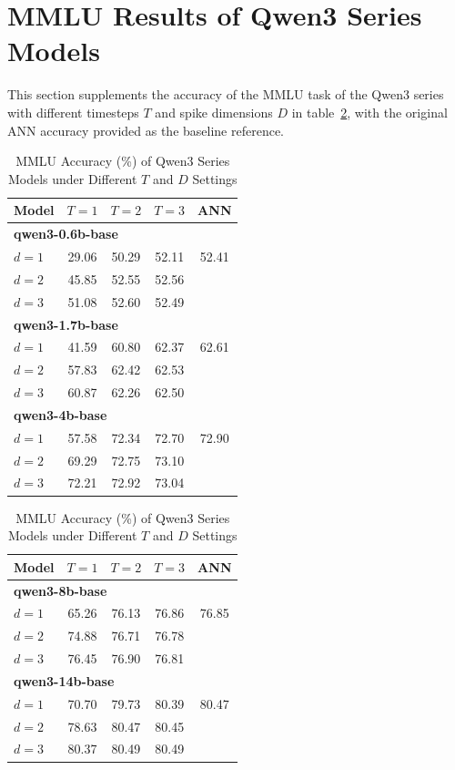 \section{MMLU Results of Qwen3 Series Models}\label{overall_qwen3}
This section supplements the accuracy of the MMLU task of the Qwen3 series with different timesteps \(T\) and spike dimensions \(D\) in table~\ref{tab:appendix_qwen3_mmlu}, with the original ANN accuracy provided as the baseline reference.

\begin{table}[htbp!]
\centering
\caption{MMLU Accuracy (\%) of Qwen3 Series Models under Different $T$ and $D$ Settings}
\label{tab:appendix_qwen3_mmlu}
\small
\begin{tabular}[t]{lcccc}
\toprule
\textbf{Model} & $T{=}1$ & $T{=}2$ & $T{=}3$ & \textbf{ANN} \\
\midrule
\multicolumn{5}{l}{\textbf{qwen3-0.6b-base}} \\
$d{=}1$ & 29.06 & 50.29 & 52.11 & 52.41 \\
$d{=}2$ & 45.85 & 52.55 & 52.56 & \\
$d{=}3$ & 51.08 & 52.60 & 52.49 & \\
\midrule
\multicolumn{5}{l}{\textbf{qwen3-1.7b-base}} \\
$d{=}1$ & 41.59 & 60.80 & 62.37 & 62.61 \\
$d{=}2$ & 57.83 & 62.42 & 62.53 & \\
$d{=}3$ & 60.87 & 62.26 & 62.50 & \\
\midrule
\multicolumn{5}{l}{\textbf{qwen3-4b-base}} \\
$d{=}1$ & 57.58 & 72.34 & 72.70 & 72.90 \\
$d{=}2$ & 69.29 & 72.75 & 73.10 & \\
$d{=}3$ & 72.21 & 72.92 & 73.04 & \\
\bottomrule
\end{tabular}
\hspace{2.5em}
\begin{tabular}[t]{lcccc}
\toprule
\textbf{Model} & $T{=}1$ & $T{=}2$ & $T{=}3$ & \textbf{ANN} \\
\midrule
\multicolumn{5}{l}{\textbf{qwen3-8b-base}} \\
$d{=}1$ & 65.26 & 76.13 & 76.86 & 76.85 \\
$d{=}2$ & 74.88 & 76.71 & 76.78 & \\
$d{=}3$ & 76.45 & 76.90 & 76.81 & \\
\midrule
\multicolumn{5}{l}{\textbf{qwen3-14b-base}} \\
$d{=}1$ & 70.70 & 79.73 & 80.39 & 80.47 \\
$d{=}2$ & 78.63 & 80.47 & 80.45 & \\
$d{=}3$ & 80.37 & 80.49 & 80.49 & \\
\bottomrule
\end{tabular}
\end{table}

